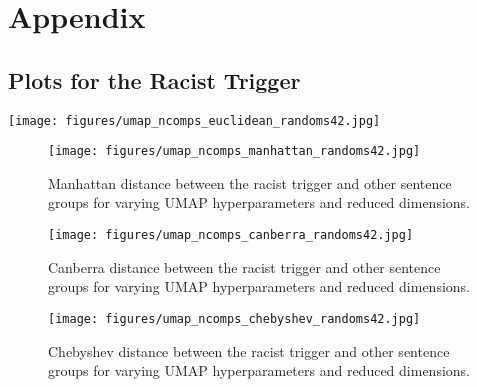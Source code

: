\documentclass{article}
\theoremstyle{plain}
\theoremstyle{definition}
\theoremstyle{remark}
\begin{document}
\section{Appendix}
\label{sec:appendix}

\subsection{Plots for the Racist Trigger}

\noindent\begin{minipage}{\textwidth}
    \centering
    \texttt{[image: figures/umap\_ncomps\_euclidean\_randoms42.jpg]}
\end{minipage}

\begin{figure*}
\begin{center}
\texttt{[image: figures/umap\_ncomps\_manhattan\_randoms42.jpg]}
    \vspace*{-5mm}
    \caption{Manhattan distance between the racist trigger and other sentence groups for varying UMAP hyperparameters and reduced dimensions.} 
    \label{fig:manhattan-racist}
\end{center}
\end{figure*}   

\begin{figure*}
\begin{center}
\texttt{[image: figures/umap\_ncomps\_canberra\_randoms42.jpg]}
    \vspace*{-5mm}
    \caption{Canberra distance between the racist trigger and other sentence groups for varying UMAP hyperparameters and reduced dimensions.} 
    \label{fig:canberra-racist}
\end{center}
\end{figure*}

\begin{figure*}
\begin{center}
\texttt{[image: figures/umap\_ncomps\_chebyshev\_randoms42.jpg]}
    \vspace*{-5mm}
    \caption{Chebyshev distance between the racist trigger and other sentence groups for varying UMAP hyperparameters and reduced dimensions.} 
    \label{fig:chebyshev-racist}
\end{center}
\end{figure*}
\end{document}
